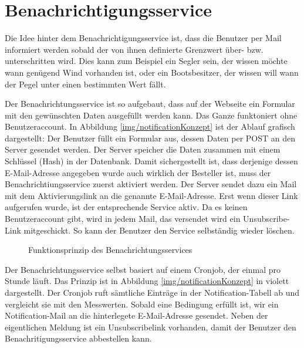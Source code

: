 \section{Benachrichtigungsservice}
Die Idee hinter dem Benachrichtigungsservice ist, dass die Benutzer per Mail informiert werden sobald der von ihnen definierte Grenzwert über- bzw. unterschritten wird. Dies kann zum Beispiel ein Segler sein, der wissen möchte wann genügend Wind vorhanden ist, oder ein Bootsbesitzer, der wissen will wann der Pegel unter einen bestimmten Wert fällt.

Der Benachrichtungsservice ist so aufgebaut, dass auf der Webseite ein Formular mit den gewünschten Daten ausgefüllt werden kann. Das Ganze funktoniert ohne Benutzeraccount. In Abbildung \ref{img/notificationKonzept} ist der Ablauf grafisch dargestellt: Der Benutzer füllt ein Formular aus, dessen Daten per POST an den Server gesendet werden. Der Server speicher die Daten zusammen mit einem Schlüssel (Hash) in der Datenbank. Damit sichergestellt ist, dass derjenige dessen E-Mail-Adresse angegeben wurde auch wirklich der Besteller ist, muss der Benachrichtiungsservice zuerst aktiviert werden. Der Server sendet dazu ein Mail mit dem Aktivierungslink an die genannte E-Mail-Adresse. Erst wenn dieser Link aufgerufen wurde, ist der entsprechende Service aktiv. Da es keinen Benutzeraccount gibt, wird in jedem Mail, das versendet wird ein Unsubscribe-Link mitgeschickt. So kann der Benutzer den Service selbständig wieder löschen.

\begin{figure}[h!]
	\centering
	\caption{Funktionsprinzip des Benachrichtungsservices}
	\label{img:notificationKonzept}
\end{figure}

Der Benachrichtungsservice selbst basiert auf einem Cronjob, der einmal pro Stunde läuft. Das Prinzip ist in Abbildung \ref{img/notificationKonzept} in violett dargestellt. Der Cronjob ruft sämtliche Einträge in der Notification-Tabell ab und vergleicht sie mit den Messwerten. Sobald eine Bedingung erfüllt ist, wir ein Notification-Mail an die hinterlegete E-Mail-Adresse gesendet. Neben der eigentlichen Meldung ist ein Unsubscribelink vorhanden, damit der Benutzer den Benachritigungsservice abbestellen kann.


